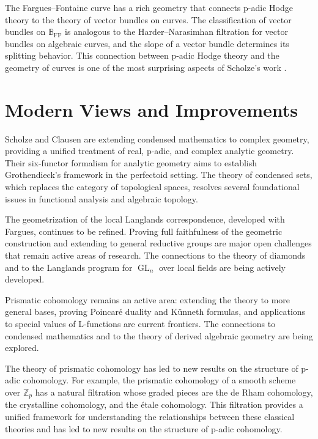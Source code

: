 The Fargues--Fontaine curve has a rich geometry that connects p-adic Hodge theory to the theory of vector bundles on curves. The classification of vector bundles on $\mathbb{B}_{\mathrm{FF}}$ is analogous to the Harder--Narasimhan filtration for vector bundles on algebraic curves, and the slope of a vector bundle determines its splitting behavior. This connection between p-adic Hodge theory and the geometry of curves is one of the most surprising aspects of Scholze's work \cite{scholze2012}.

\section{Modern Views and Improvements}

Scholze and Clausen are extending condensed mathematics to complex geometry, providing a unified treatment of real, p-adic, and complex analytic geometry. Their six-functor formalism for analytic geometry aims to establish Grothendieck's framework in the perfectoid setting. The theory of condensed sets, which replaces the category of topological spaces, resolves several foundational issues in functional analysis and algebraic topology.

The geometrization of the local Langlands correspondence, developed with Fargues, continues to be refined. Proving full faithfulness of the geometric construction and extending to general reductive groups are major open challenges that remain active areas of research. The connections to the theory of diamonds and to the Langlands program for $\operatorname{GL}_n$ over local fields are being actively developed.

Prismatic cohomology remains an active area: extending the theory to more general bases, proving Poincar\'e duality and K\"unneth formulas, and applications to special values of L-functions are current frontiers. The connections to condensed mathematics and to the theory of derived algebraic geometry are being explored.

The theory of prismatic cohomology has led to new results on the structure of p-adic cohomology. For example, the prismatic cohomology of a smooth scheme over $\mathbb{Z}_p$ has a natural filtration whose graded pieces are the de Rham cohomology, the crystalline cohomology, and the \'{e}tale cohomology. This filtration provides a unified framework for understanding the relationships between these classical theories and has led to new results on the structure of p-adic cohomology.

